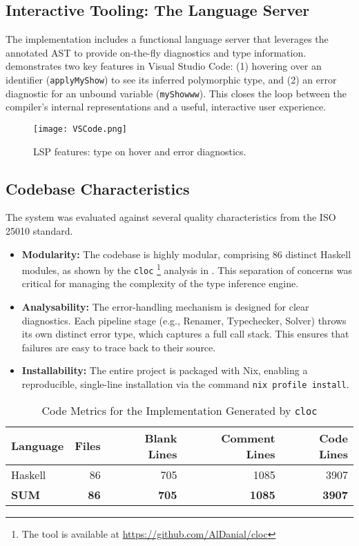 \subsection{Interactive Tooling: The Language Server}
The implementation includes a functional language server that leverages the annotated AST to provide on-the-fly diagnostics and type information.  demonstrates two key features in Visual Studio Code: (1) hovering over an identifier (\texttt{applyMyShow}) to see its inferred polymorphic type, and (2) an error diagnostic for an unbound variable (\texttt{myShowww}). This closes the loop between the compiler's internal representations and a useful, interactive user experience.

\begin{figure}[h!]
    \centering
    \texttt{[image: VSCode.png]}
    \caption{LSP features: type on hover and error diagnostics.}
    \label{fig:lsp-demo}
\end{figure}

\subsection{Codebase Characteristics}
The system was evaluated against several quality characteristics from the ISO 25010 standard.
\begin{itemize}
    \item \textbf{Modularity:} The codebase is highly modular, comprising 86 distinct Haskell modules, as shown by the \texttt{cloc} \footnote{The tool is available at \url{https://github.com/AlDanial/cloc}} analysis in . This separation of concerns was critical for managing the complexity of the type inference engine.
    \item \textbf{Analysability:} The error-handling mechanism is designed for clear diagnostics. Each pipeline stage (e.g., Renamer, Typechecker, Solver) throws its own distinct error type, which captures a full call stack. This ensures that failures are easy to trace back to their source.
    \item \textbf{Installability:} The entire project is packaged with Nix, enabling a reproducible, single-line installation via the command \texttt{nix profile install}.
\end{itemize}

\begin{table}[h!]
    \centering
    \footnotesize
    \caption{Code Metrics for the \Arralac Implementation Generated by \texttt{cloc}}
    \begin{tabular}{lrrrr}
        \toprule
        \textbf{Language} & \textbf{Files} & \textbf{Blank Lines} & \textbf{Comment Lines} & \textbf{Code Lines} \\
        \midrule
        Haskell           & 86             & 705                  & 1085                   & 3907                \\
        \midrule
        \textbf{SUM}      & \textbf{86}    & \textbf{705}         & \textbf{1085}          & \textbf{3907}       \\
        \bottomrule
    \end{tabular}
    \label{table:cloc}
\end{table}

